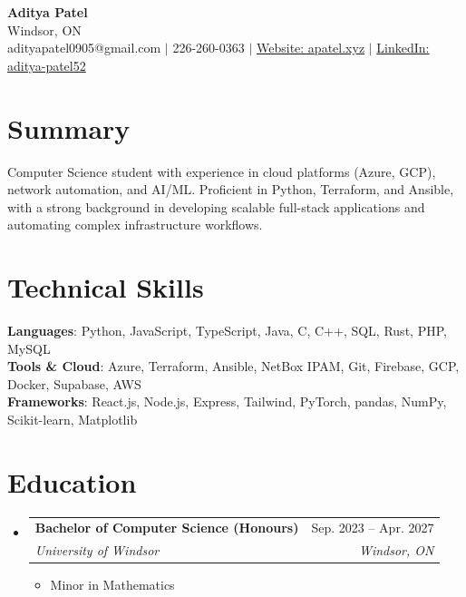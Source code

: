 \documentclass[letterpaper,11pt]{article}
\makeatletter
\newcommand{\resumeItem}[1]{
  \item\small{
    {#1 \vspace{-2pt}}
  }
}
\newcommand{\resumeSubheading}[4]{
  \vspace{-2pt}\item
    \begin{tabular*}{0.97\textwidth}[t]{l@{\extracolsep{\fill}}r}
      \textbf{#1} & #2 \\
      \textit{\small#3} & \textit{\small #4} \\
    \end{tabular*}\vspace{-7pt}
}
\newcommand{\resumeSubHeadingListStart}{\begin{itemize}[leftmargin=0.15in, label={}]}
\newcommand{\resumeSubHeadingListEnd}{\end{itemize}\vspace{-8pt}}
\newcommand{\resumeItemListStart}{\begin{itemize}\vspace{-2pt}}
\newcommand{\resumeItemListEnd}{\end{itemize}\vspace{-8pt}}
\makeatother
\begin{document}
\begin{center}
    \textbf{\Huge Aditya Patel} \\ \vspace{1pt}
    Windsor, ON \\ \vspace{1pt}
     {adityapatel0905@gmail.com} $|$ {226-260-0363} $|$ \href{https://apatel.xyz/}{Website: apatel.xyz} $|$ \href{https://www.linkedin.com/in/aditya-patel52/}{LinkedIn: aditya-patel52}
\end{center}

\section{Summary}
  \begin{itemize}[leftmargin=0.15in, label={}]
    \small{\item{
      Computer Science student with experience in cloud platforms (Azure, GCP), network automation, and AI/ML. Proficient in Python, Terraform, and Ansible, with a strong background in developing scalable full-stack applications and automating complex infrastructure workflows.
    }}
    \vspace{-6pt}
 \end{itemize}

\section{Technical Skills}
 \begin{itemize}[leftmargin=0.15in, label={}]
    \small{\item{
     \textbf{Languages}{: Python, JavaScript, TypeScript, Java, C, C++, SQL, Rust, PHP, MySQL} \\
     \textbf{Tools \& Cloud}{: Azure, Terraform, Ansible, NetBox IPAM, Git, Firebase, GCP, Docker, Supabase, AWS} \\
     \textbf{Frameworks}{: React.js, Node.js, Express, Tailwind, PyTorch, pandas, NumPy, Scikit-learn, Matplotlib}
    }}
    \vspace{-6pt}
 \end{itemize}

\section{Education}
  \resumeSubHeadingListStart
    \resumeSubheading
      {Bachelor of Computer Science (Honours)}{Sep. 2023 -- Apr. 2027}
      {University of Windsor}{Windsor, ON}
        \resumeItemListStart
            \resumeItem{Minor in Mathematics}
        \resumeItemListEnd
  \resumeSubHeadingListEnd
\end{document}
